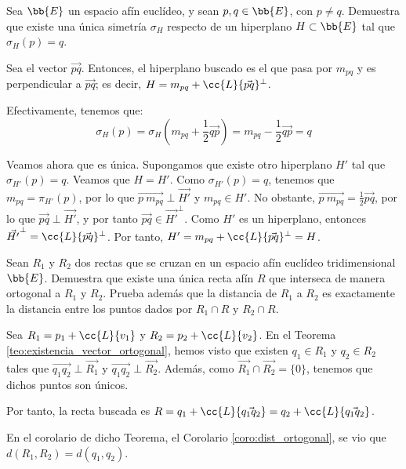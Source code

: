 \begin{ejercicio}
    Sea $\bb{E}$ un espacio afín euclídeo, y sean $p,q\in \bb{E}$, con $p\neq q$.
    Demuestra que existe una única simetría $\sigma_H$ respecto de un hiperplano $H\subset \bb{E}$ tal que $\sigma_H(p)=q$.

    Sea el vector $\vec{pq}$. Entonces, el hiperplano buscado es el que pasa por $m_{pq}$ y es perpendicular a $\vec{pq}$;
    es decir, $H = m_{pq} + \cc{L}\{\vec{pq}\}^\perp$.

    Efectivamente, tenemos que:
    \begin{equation*}
        \sigma_H(p) = \sigma_H\left(m_{pq} + \frac{1}{2}\vec{qp}\right) = m_{pq} - \frac{1}{2}\vec{qp} = q
    \end{equation*}

    Veamos ahora que es única. Supongamos que existe otro hiperplano $H'$ tal que $\sigma_{H'}(p)=q$. Veamos que $H=H'$.
    Como $\sigma_{H'}(p)=q$, tenemos que $m_{pq}=\pi_{H'}(p)$, por lo que $\vec{p~m_{pq}}\perp \vec{H'}$ y $m_{pq}\in H'$.
    No obstante, $\vec{p~m_{pq}}=\frac{1}{2}\vec{pq}$, por lo que $\vec{pq}\perp \vec{H'}$, y por tanto $\vec{pq}\in \vec{H'}^\perp$.
    Como $H'$ es un hiperplano, entonces $\vec{H'}^\perp = \cc{L}\{\vec{pq}\}^\perp$. Por tanto, $H'= m_{pq} + \cc{L}\{\vec{pq}\}^\perp = H$.
\end{ejercicio}

\begin{ejercicio}
    Sean $R_1$ y $R_2$ dos rectas que se cruzan en un espacio afín euclídeo tridimensional $\bb{E}$.
    Demuestra que existe una única recta afín $R$ que interseca de manera ortogonal a $R_1$ y $R_2$.
    Prueba además que la distancia de $R_1$ a $R_2$ es exactamente la distancia entre los puntos dados por $R_1 \cap R$ y $R_2 \cap R$.

    Sea $R_1=p_1 + \cc{L}\{v_1\}$ y $R_2=p_2 + \cc{L}\{v_2\}$.
    En el Teorema \ref{teo:existencia_vector_ortogonal}, hemos visto que existen $q_1\in R_1$ y $q_2\in R_2$
    tales que $\vec{q_1q_2}\perp \vec{R_1}$ y $\vec{q_1q_2}\perp \vec{R_2}$. Además, como $\vec{R_1}\cap \vec{R_2}=\{0\}$, tenemos que dichos puntos son únicos.

    Por tanto, la recta buscada es $R=q_1 + \cc{L}\{\vec{q_1q_2}\} = q_2 + \cc{L}\{\vec{q_1q_2}\}$.

    En el corolario de dicho Teorema, el Corolario \ref{coro:dist_ortogonal}, se vio que $d(R_1,R_2) = d(q_1,q_2)$.
\end{ejercicio}

